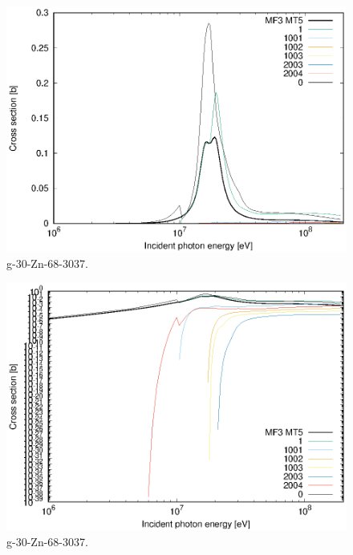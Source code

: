 \begin{figure}
 \includegraphics[width=\linewidth]{eps/g_30-Zn-68_3037.eps}
  \caption{g-30-Zn-68-3037.}
\end{figure}
\begin{figure}
 \includegraphics[width=\linewidth]{eps-log/g_30-Zn-68_3037.eps}
 \caption{g-30-Zn-68-3037.}
\end{figure}
\newpage \clearpage

